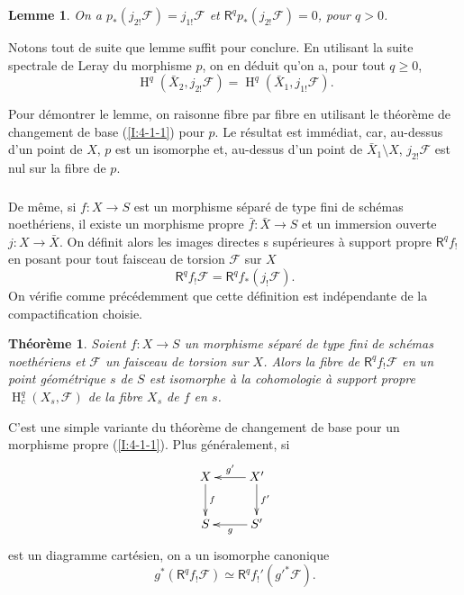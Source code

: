 \documentclass{book}
\DeclareMathOperator{\h}{H}
\newcommand{\cF}{\mathcal{F}}
\newcommand{\R}{\mathsf{R}}
\newtheorem{theorem}[subsubsection]{Théorème}
\newtheorem{lemma}[subsubsection]{Lemme}
\begin{document}
\begin{lemma}\label{I:4-5-2}
On a $p_*(j_{2!} \cF) = j_{1!} \cF$ et $\R^q p_*(j_{2!} \cF) = 0$, pour $q>0$. 
\end{lemma}

Notons tout de suite que lemme suffit pour conclure. En utilisant la suite 
spectrale de Leray du morphisme $p$, on en déduit qu'on a, pour tout 
$q\geqslant 0$, 
\[
  \h^q(\bar X_2, j_{2!} \cF) = \h^q(\bar X_1, j_{1!} \cF) \text{.}
\]

Pour démontrer le lemme, on raisonne fibre par fibre en utilisant le théorème 
de changement de base (\ref{I:4-1-1}) pour $p$. Le résultat est immédiat, car, 
au-dessus d'un point de $X$, $p$ est un isomorphe et, au-dessus d'un point de 
$\bar X_1\setminus X$, $j_{2!} \cF$ est nul sur la fibre de $p$. 





\subsubsection{}\label{I:4-5-3}

De même, si $f:X\to S$ est un morphisme séparé de type fini de schémas 
noethériens, il existe un morphisme propre $\bar f:\bar X\to S$ et un 
immersion ouverte $j:X\to \bar X$. On définit alors les images directes s
supérieures à support propre $\R^q f_!$ en posant pour tout faisceau de 
torsion $\cF$ sur $X$
\[
  \R^q f_! \cF = \R^q f_*(j_! \cF) \text{.}
\]
On vérifie comme précédemment que cette définition est indépendante de 
la compactification choisie. 





\begin{theorem}\label{I:4-5-4}
Soient $f:X\to S$ un morphisme séparé de type fini de schémas noethériens 
et $\cF$ un faisceau de torsion sur $X$. Alors la fibre de $\R^q f_! \cF$ en un 
point géométrique $s$ de $S$ est isomorphe à la cohomologie à support 
propre $\h_c^q(X_s,\cF)$ de la fibre $X_s$ de $f$ en $s$. 
\end{theorem}

C'est une simple variante du théorème de changement de base pour un morphisme 
propre (\ref{I:4-1-1}). Plus généralement, si 
\[\xymatrix{
  X \ar[d]^-f
    & X' \ar[l]_-{g'} \ar[d]^-{f'} \\
  S 
    & S' \ar[l]^-g
}\]
est un diagramme cartésien, on a un isomorphe canonique 
\begin{equation}\label{I:eq:3}
  g^* (\R^q f_! \cF) \simeq \R^q f_!'({g'}^* \cF) \text{.}
\end{equation}
\end{document}
